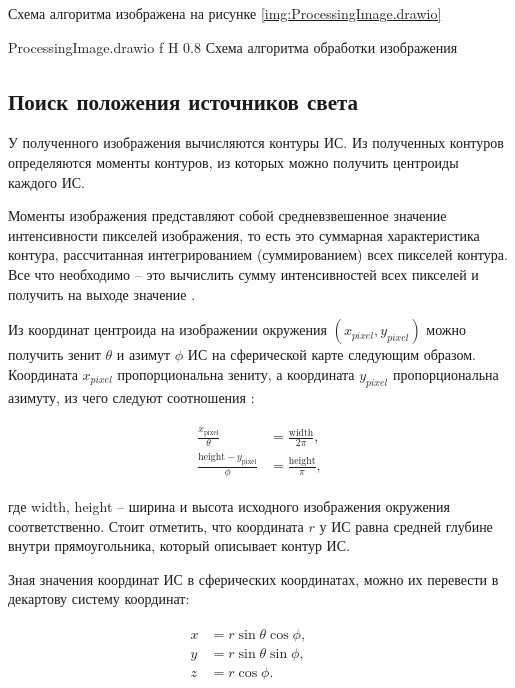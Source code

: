 Схема алгоритма изображена на рисунке \ref{img:ProcessingImage.drawio}

{ProcessingImage.drawio}
{f}
{H}
{0.8\textwidth}
{Схема алгоритма обработки изображения}

\subsection{Поиск положения источников света}

У полученного изображения вычисляются контуры ИС. Из полученных контуров определяются моменты контуров, из которых можно получить центроиды каждого ИС. 

Моменты изображения представляют собой средневзвешенное значение интенсивности пикселей изображения, то есть это суммарная характеристика контура, рассчитанная интегрированием (суммированием) всех пикселей контура. Все что необходимо -- это вычислить сумму интенсивностей всех пикселей и получить на выходе значение \cite{sns_tras}.

Из координат центроида на изображении окружения $(x_{pixel}, y_{pixel})$ можно получить зенит $\theta$ и азимут $\phi$ ИС на сферической карте следующим образом. Координата $x_{pixel}$ пропорциональна зениту, а координата $y_{pixel}$ пропорциональна азимуту, из чего следуют соотношения \cite{osti2019real}:

\begin{equation}
	\begin{aligned}
		\begin{split}
			\frac{x_{\text{pixel}}}{\theta} &= \frac{\text{width}}{2\pi}, \\
			\frac{\text{height} - y_{\text{pixel}}}{\phi} &= \frac{\text{height}}{\pi}, 
		\end{split}
	\end{aligned}
\end{equation}

где width, height -- ширина и высота исходного изображения окружения соответственно. Стоит отметить, что координата $r$ у ИС равна средней глубине внутри прямоугольника, который описывает контур ИС.

Зная значения координат ИС в сферических координатах, можно их перевести в декартову систему координат:

\begin{equation}
	\begin{aligned}
		\begin{split}
			x &= r \sin\theta \cos\phi, &&\\
			y &= r \sin\theta \sin\phi, &&\\
			z &= r \cos\phi. &&\\
		\end{split}
	\end{aligned}
\end{equation}

